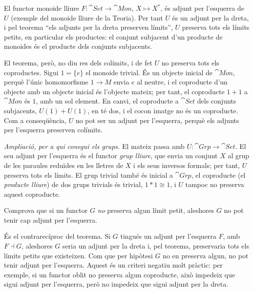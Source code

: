 \begin{solucio}
El functor monoide lliure $F\colon\cat{Set}\to\cat{Mon}$, $X\mapsto X^*$, és adjunt per l'esquerra de $U$ (exemple del monoide lliure de la Teoria). Per tant $U$ és un adjunt per la dreta, i pel teorema \enquote{els adjunts per la dreta preserven límits}, $U$ preserva tots els límits petits, en particular els productes: el conjunt subjacent d'un producte de monoides és el producte dels conjunts subjacents.

El teorema, però, no diu res dels colímits, i de fet $U$ no preserva tots els coproductes. Sigui $1=\{e\}$ el monoide trivial. És un objecte inicial de $\cat{Mon}$, perquè l'únic homomorfisme $1\to M$ envia $e$ al neutre, i el coproducte d'un objecte amb un objecte inicial és l'objecte mateix; per tant, el coproducte $1+1$ a $\cat{Mon}$ és $1$, amb un sol element. En canvi, el coproducte a $\cat{Set}$ dels conjunts subjacents, $U(1)+U(1)$, en té dos, i el cocon imatge no és un coproducte. Com a conseqüència, $U$ no pot ser un adjunt per l'esquerra, perquè els adjunts per l'esquerra preserven colímits.

\emph{Ampliació, per a qui conegui els grups.} El mateix passa amb $U\colon\cat{Grp}\to\cat{Set}$. El seu adjunt per l'esquerra és el functor \emph{grup lliure}, que envia un conjunt $X$ al grup de les paraules reduïdes en les lletres de $X$ i els seus inversos formals; per tant, $U$ preserva tots els límits. El grup trivial també és inicial a $\cat{Grp}$, el coproducte (el \emph{producte lliure}) de dos grups trivials és trivial, $1*1\cong 1$, i $U$ tampoc no preserva aquest coproducte.
\end{solucio}

\begin{exercici}
Comprova que si un functor $G$ \emph{no} preserva algun límit petit, aleshores $G$ no pot tenir cap adjunt per l'esquerra.
\end{exercici}

\begin{solucio}
És el contrarecíproc del teorema. Si $G$ tingués un adjunt per l'esquerra $F$, amb $F\dashv G$, aleshores $G$ seria un adjunt per la dreta i, pel teorema, preservaria tots els límits petits que existeixen. Com que per hipòtesi $G$ no en preserva algun, no pot tenir adjunt per l'esquerra. Aquest és un criteri negatiu molt pràctic: per exemple, si un functor oblit no preserva algun coproducte, això impedeix que sigui adjunt per l'esquerra, però no impedeix que sigui adjunt per la dreta.
\end{solucio}

